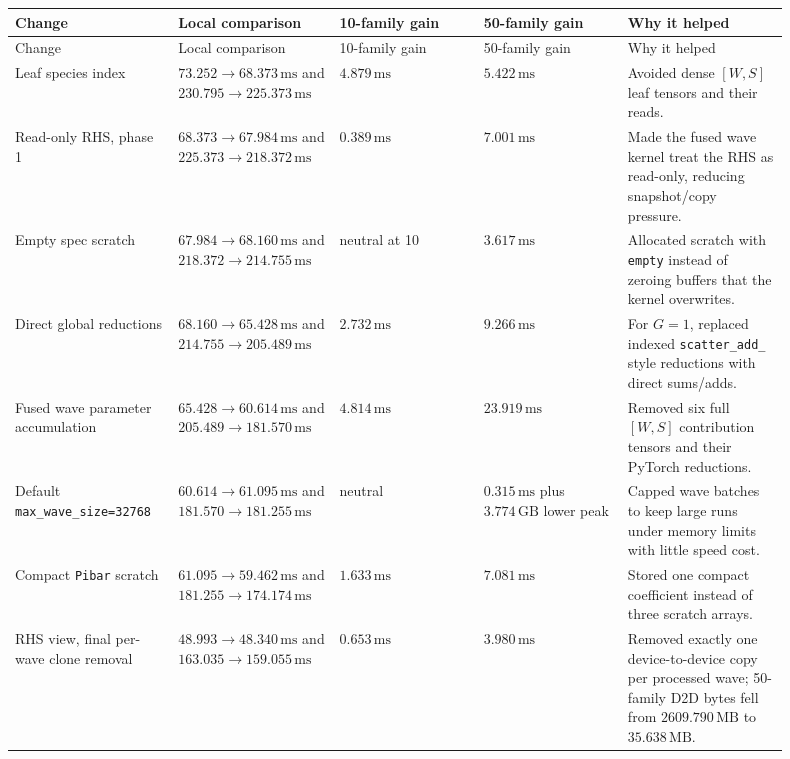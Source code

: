 \documentclass[11pt]{article}
\newcommand{\ms}{\,\mathrm{ms}}
\newcommand{\gb}{\,\mathrm{GB}}
\newcommand{\mb}{\,\mathrm{MB}}
\newcommand{\code}[1]{\texttt{#1}}
\begin{document}
\begin{longtable}{p{0.18\linewidth}p{0.19\linewidth}p{0.17\linewidth}p{0.17\linewidth}p{0.19\linewidth}}
\toprule
Change & Local comparison & 10-family gain & 50-family gain & Why it helped \\
\midrule
\endfirsthead
\toprule
Change & Local comparison & 10-family gain & 50-family gain & Why it helped \\
\midrule
\endhead

Leaf species index & $73.252 \to 68.373\ms$ and $230.795 \to 225.373\ms$ &
$4.879\ms$ & $5.422\ms$ & Avoided dense $[W,S]$ leaf tensors and their reads. \\

Read-only RHS, phase 1 & $68.373 \to 67.984\ms$ and $225.373 \to 218.372\ms$ &
$0.389\ms$ & $7.001\ms$ & Made the fused wave kernel treat the RHS as read-only, reducing snapshot/copy pressure. \\

Empty spec scratch & $67.984 \to 68.160\ms$ and $218.372 \to 214.755\ms$ &
neutral at 10 & $3.617\ms$ & Allocated scratch with \code{empty} instead of zeroing buffers that the kernel overwrites. \\

Direct global reductions & $68.160 \to 65.428\ms$ and $214.755 \to 205.489\ms$ &
$2.732\ms$ & $9.266\ms$ & For $G=1$, replaced indexed \code{scatter\_add\_} style reductions with direct sums/adds. \\

Fused wave parameter accumulation & $65.428 \to 60.614\ms$ and $205.489 \to 181.570\ms$ &
$4.814\ms$ & $23.919\ms$ & Removed six full $[W,S]$ contribution tensors and their PyTorch reductions. \\

Default \code{max\_wave\_size=32768} & $60.614 \to 61.095\ms$ and $181.570 \to 181.255\ms$ &
neutral & $0.315\ms$ plus $3.774\gb$ lower peak & Capped wave batches to keep large runs under memory limits with little speed cost. \\

Compact \code{Pibar} scratch & $61.095 \to 59.462\ms$ and $181.255 \to 174.174\ms$ &
$1.633\ms$ & $7.081\ms$ & Stored one compact coefficient instead of three scratch arrays. \\

RHS view, final per-wave clone removal & $48.993 \to 48.340\ms$ and $163.035 \to 159.055\ms$ &
$0.653\ms$ & $3.980\ms$ & Removed exactly one device-to-device copy per processed wave; 50-family D2D bytes fell from $2609.790\mb$ to $35.638\mb$. \\


\end{longtable}
\end{document}
